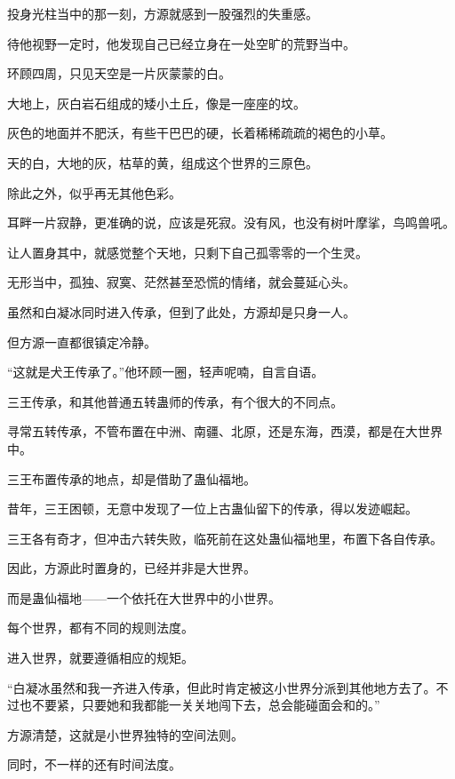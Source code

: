 
\begin{this_body}

投身光柱当中的那一刻，方源就感到一股强烈的失重感。

待他视野一定时，他发现自己已经立身在一处空旷的荒野当中。

环顾四周，只见天空是一片灰蒙蒙的白。

大地上，灰白岩石组成的矮小土丘，像是一座座的坟。

灰色的地面并不肥沃，有些干巴巴的硬，长着稀稀疏疏的褐色的小草。

天的白，大地的灰，枯草的黄，组成这个世界的三原色。

除此之外，似乎再无其他色彩。

耳畔一片寂静，更准确的说，应该是死寂。没有风，也没有树叶摩挲，鸟鸣兽吼。

让人置身其中，就感觉整个天地，只剩下自己孤零零的一个生灵。

无形当中，孤独、寂寞、茫然甚至恐慌的情绪，就会蔓延心头。

虽然和白凝冰同时进入传承，但到了此处，方源却是只身一人。

但方源一直都很镇定冷静。

“这就是犬王传承了。”他环顾一圈，轻声呢喃，自言自语。

三王传承，和其他普通五转蛊师的传承，有个很大的不同点。

寻常五转传承，不管布置在中洲、南疆、北原，还是东海，西漠，都是在大世界中。

三王布置传承的地点，却是借助了蛊仙福地。

昔年，三王困顿，无意中发现了一位上古蛊仙留下的传承，得以发迹崛起。

三王各有奇才，但冲击六转失败，临死前在这处蛊仙福地里，布置下各自传承。

因此，方源此时置身的，已经并非是大世界。

而是蛊仙福地——一个依托在大世界中的小世界。

每个世界，都有不同的规则法度。

进入世界，就要遵循相应的规矩。

“白凝冰虽然和我一齐进入传承，但此时肯定被这小世界分派到其他地方去了。不过也不要紧，只要她和我都能一关关地闯下去，总会能碰面会和的。”

方源清楚，这就是小世界独特的空间法则。

同时，不一样的还有时间法度。


\end{this_body}
